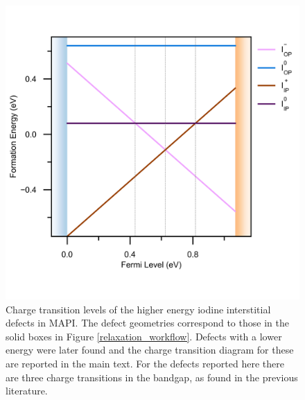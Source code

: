 

\begin{figure}[h!] 
\centering
  \includegraphics[width=0.7\columnwidth]{figures/ap7/charge_transition_HSE_meta.png}
  \caption[Charge transition levels of $\mathrm{I}_\mathrm{i}$]{Charge transition levels of the higher energy iodine interstitial defects in MAPI. The defect geometries correspond to those in the solid boxes in Figure \ref{relaxation_workflow}. Defects with a lower energy were later found and the charge transition diagram for these are reported in the main text. For the defects reported here there are three charge transitions in the bandgap, as found in the previous literature.\autocite{Du2015,Meggiolaro2018}}
\label{charge_transition_meta}
\end{figure}